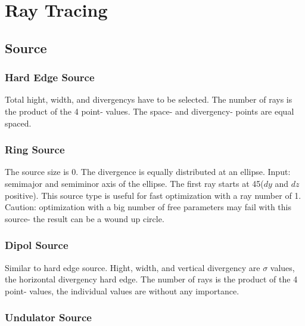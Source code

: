 



\chapter{Ray Tracing}   

\section{Source}
\subsection{Hard Edge Source} 
Total hight, width, and divergencys have to be selected. The number of rays is
the product of the 4 point- values.  The space- and divergency- points are
equal spaced.

\subsection{Ring Source} 
The source size is 0. The divergence is equally distributed at an
ellipse. Input: semimajor and semiminor axis of the ellipse. The first
ray starts at 45\grad ($dy$ and $dz$ positive). This source type is
useful for fast optimization with a ray number of 1. Caution:
optimization with a big number of free parameters may fail with this
source- the result can be a wound up circle. 

\subsection{Dipol Source} 
Similar to hard edge source. Hight, width, and vertical divergency are $\sigma$
values, the horizontal divergency hard edge. The number of rays is
the product of the 4 point- values, the individual values are without any
importance.

\subsection{Undulator Source} 

